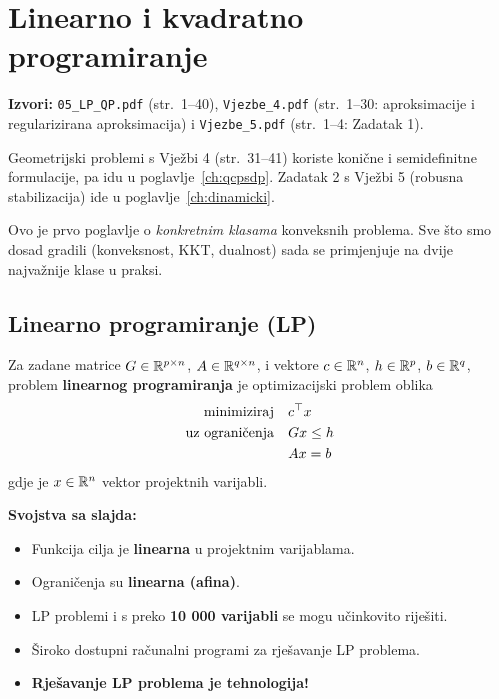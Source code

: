 \chapter{Linearno i kvadratno programiranje}
\label{ch:lpqp}

\begin{izvor}
\textbf{Izvori:} \texttt{05\_LP\_QP.pdf} (str.\ 1--40),
\texttt{Vjezbe\_4.pdf} (str.\ 1--30: aproksimacije i regularizirana
aproksimacija) i \texttt{Vjezbe\_5.pdf} (str.\ 1--4: Zadatak 1).

Geometrijski problemi s Vježbi 4 (str.\ 31--41) koriste konične i
semidefinitne formulacije, pa idu u poglavlje~\ref{ch:qcpsdp}. Zadatak 2 s
Vježbi 5 (robusna stabilizacija) ide u poglavlje~\ref{ch:dinamicki}.
\end{izvor}

Ovo je prvo poglavlje o \emph{konkretnim klasama} konveksnih problema. Sve što
smo dosad gradili (konveksnost, KKT, dualnost) sada se primjenjuje na dvije
najvažnije klase u praksi.

\section{Linearno programiranje (LP)}

\begin{definicija}[LP problem]
Za zadane matrice $G \in \R^{p\times n}$, $A \in \R^{q\times n}$, i vektore
$c \in \R^n$, $h \in \R^p$, $b \in \R^q$, problem \textbf{linearnog
programiranja} je optimizacijski problem oblika
\begin{equation}
\label{eq:lp}
\begin{aligned}
\minim & c\T x \\
\uzogr & Gx \le h \\
       & Ax = b
\end{aligned}
\end{equation}
gdje je $x \in \R^n$ vektor projektnih varijabli.
\end{definicija}

\textbf{Svojstva sa slajda:}

\begin{itemize}
  \item Funkcija cilja je \textbf{linearna} u projektnim varijablama.
  \item Ograničenja su \textbf{linearna (afina)}.
  \item LP problemi i s preko \textbf{10 000 varijabli} se mogu učinkovito
        riješiti.
  \item Široko dostupni računalni programi za rješavanje LP problema.
  \item \textbf{Rješavanje LP problema je tehnologija!}
\end{itemize}

